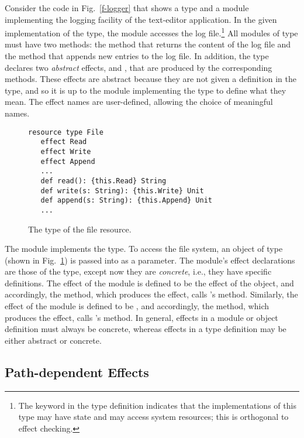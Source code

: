 Consider the code in Fig.~\ref{f-logger} that shows a type and a module implementing the logging facility of the text-editor application.  In the given implementation of the  type, the  module accesses the log file.\footnote{The keyword  in the type definition indicates that the implementations of this type may have state and may access system resources; this is orthogonal to effect checking.} All modules of type  must have two methods: the  method that returns the content of the log file and the  method that appends new entries to the log file. In addition, the  type declares two \textit{abstract} effects,  and , that are produced by the corresponding methods. These effects are abstract because they are not given a definition in the  type, and so it is up to the module implementing the  type to define what they mean. The effect names are user-defined, allowing the choice of meaningful names.

\begin{figure}[t]
\begin{lstlisting}
resource type File
   effect Read
   effect Write
   effect Append
   ...
   def read(): {this.Read} String
   def write(s: String): {this.Write} Unit
   def append(s: String): {this.Append} Unit
   ...
\end{lstlisting}
\caption{The type of the file resource.}
\label{f-file}
\end{figure}

The  module implements the  type. To access the file system, an object of type  (shown in Fig.~\ref{f-file}) is passed into  as a parameter. The  module's effect declarations are those of the  type, except now they are \textit{concrete}, i.e., they have specific definitions. The  effect of the  module is defined to be the  effect of the  object, and accordingly, the  method, which produces the  effect, calls 's  method. Similarly, the  effect of the  module is defined to be , and accordingly, the  method, which produces the  effect, calls 's  method. In general, effects in a module or object definition must always be concrete, whereas effects in a type definition may be either abstract or concrete.


\subsection{Path-dependent Effects}


